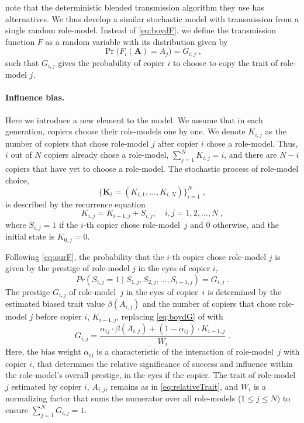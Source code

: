 \documentclass[12pt]{extarticle}
\let\vec\mathbf
\begin{document}
\citet{evolutionBook} note that the deterministic blended transmission algorithm they use has alternatives. We thus develop a similar stochastic model with transmission from a single random role-model. Instead of \cref{eq:boydF}, we define the transmission function $F$ as a random variable with its distribution given by 
\begin{equation}\label{eq:ourF}
\Pr\big(F_i(\vec{A}) = A_{j}\big) = G_{i,j} \;,
\end{equation}
such that $G_{i,j}$ gives the probability of copier $i$ to choose to copy the trait of role-model $j$.

\paragraph{Influence bias.}
Here we introduce a new element to the model.
We assume that in each generation, copiers choose their role-models one by one.
We denote $K_{i,j}$ as the number of copiers that chose role-model $j$ after copier $i$ chose a role-model. Thus, $i$ out of $N$ copiers already chose a role-model, $\sum_{j=1}^N{K_{i,j}} = i$, and there are $N-i$ copiers that have yet to choose a role-model.
The stochastic process of role-model choice, 
\begin{equation} \label{eq:process}
\big\{\vec{K}_i = (K_{i,1}, \ldots, K_{i,N}) \big\}_{i=1}^N \;,
\end{equation}
is described by the recurrence equation
\begin{equation} \label{eq:recurrence}
K_{i,j} = K_{i-1,j} + S_{i,j}, \quad i,j=1,2,\ldots,N \;,
\end{equation}
where $S_{i,j}=1$ if the $i$-th copier chose role-model~$j$ and 0 otherwise, and the initial state is $K_{0,j}=0$.

Following \cref{eq:ourF}, the probability that the $i$-th copier chose role-model $j$ is given by the prestige of role-model $j$ in the eyes of copier $i$,
\begin{equation}\label{eq:recPrestige}
Pr(S_{i,j}=1 \mid S_{1,j},S_{2,j},...,S_{i-1,j}) = G_{i,j} \;.
\end{equation}
The prestige $G_{i,j}$ of role-model~$j$ in the eyes of copier~$i$ is determined by the estimated biased trait value $\beta(A_{i,j})$ and the number of copiers that chose role-model $j$ before copier $i$, $K_{i-1,j}$, replacing \cref{eq:boydG} of \citet{evolutionBook} with
\begin{equation}\label{eq:prestige}
G_{i,j} = \frac{\alpha_{ij} \cdot \beta(A_{i,j}) + (1-\alpha_{ij}) \cdot K_{i-1,j}}{W_i} \;.
\end{equation}
Here, the bias weight $\alpha_{ij}$ is a characteristic of the interaction of role-model~$j$ with copier $i$, that determines the relative significance of success and influence within the role-model's overall prestige, in the eyes if the copier. The trait of role-model $j$ estimated by copier $i$, $A_{i,j}$, remains as in \cref{eq:relativeTrait}, and $W_i$ is a normalizing factor that sums the numerator over all role-models ($1\le j \le N)$ to ensure $\sum_{j=1}^{N}{G_{i,j}}=1$.
\end{document}
